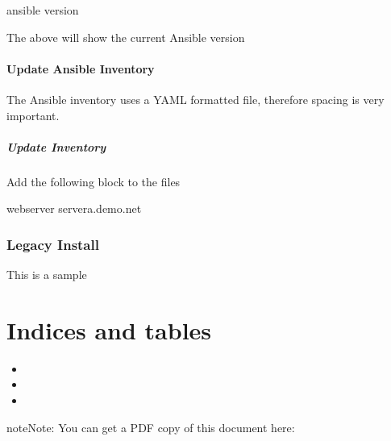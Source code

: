 \documentclass[letterpaper,10pt,english]{sphinxmanual}
\begin{document}
\begin{sphinxVerbatim}[commandchars=\\\{\}]
ansible \PYGZhy{}\PYGZhy{}version
\end{sphinxVerbatim}

\sphinxAtStartPar
The above will show the current Ansible version


\subsubsection{Update Ansible Inventory}
\label{\detokenize{procedures:update-ansible-inventory}}
\sphinxAtStartPar
The Ansible inventory uses a YAML formatted file, therefore spacing is very important.


\paragraph{Update Inventory}
\label{\detokenize{procedures:update-inventory}}
\sphinxAtStartPar
Add the following block to the  files

\begin{sphinxVerbatim}[commandchars=\\\{\}]
\PYG{o}{[}webserver\PYG{o}{]}
servera.demo.net
\end{sphinxVerbatim}


\subsection{Legacy Install}
\label{\detokenize{legacy/legacy-install:legacy-install}}\label{\detokenize{legacy/legacy-install::doc}}
\sphinxAtStartPar
This is a sample


\chapter{Indices and tables}
\label{\detokenize{index:indices-and-tables}}\begin{itemize}
\item {} 
\sphinxAtStartPar
{}

\item {} 
\sphinxAtStartPar
{}

\item {} 
\sphinxAtStartPar
{}

\end{itemize}

\begin{sphinxadmonition}{note}{Note:}
\sphinxAtStartPar
You can get a PDF copy of this document here: 
\end{sphinxadmonition}



\renewcommand{\indexname}{Index}
\printindex
\end{document}
